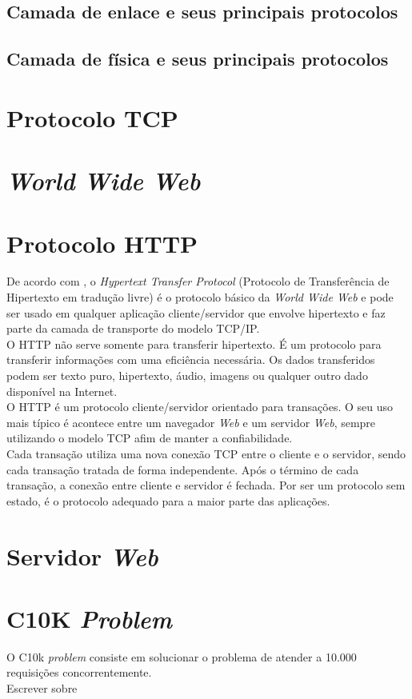 \subsection{Camada de enlace e seus principais protocolos}
\subsection{Camada de física e seus principais protocolos}

\section{Protocolo TCP}

\section{\textit{World Wide Web}}

\section{Protocolo HTTP}
De acordo com , o \textit{Hypertext Transfer Protocol} (Protocolo de Transferência de Hipertexto em tradução livre) é o protocolo básico da \textit{World Wide Web} e pode ser usado em qualquer aplicação cliente/servidor que envolve hipertexto e faz parte da camada de transporte do modelo TCP/IP.\\
O HTTP não serve somente para transferir hipertexto. É um protocolo para transferir informações com uma eficiência necessária. Os dados transferidos podem ser texto puro, hipertexto, áudio, imagens ou qualquer outro dado disponível na Internet.\\
O HTTP é um protocolo cliente/servidor orientado para transações. O seu uso mais típico é acontece entre um navegador \textit{Web} e um servidor \textit{Web}, sempre utilizando o modelo TCP afim de manter a confiabilidade.\\
Cada transação utiliza uma nova conexão TCP entre o cliente e o servidor, sendo cada transação tratada de forma independente. Após o término de cada transação, a conexão entre cliente e servidor é fechada. Por ser um protocolo sem estado, é o protocolo adequado para a maior parte das aplicações.

\section{Servidor \textit{Web}}

\section{C10K \textit{Problem}}
O C10k \textit{problem} consiste em solucionar o problema de atender a 10.000 requisições concorrentemente.\\
Escrever sobre